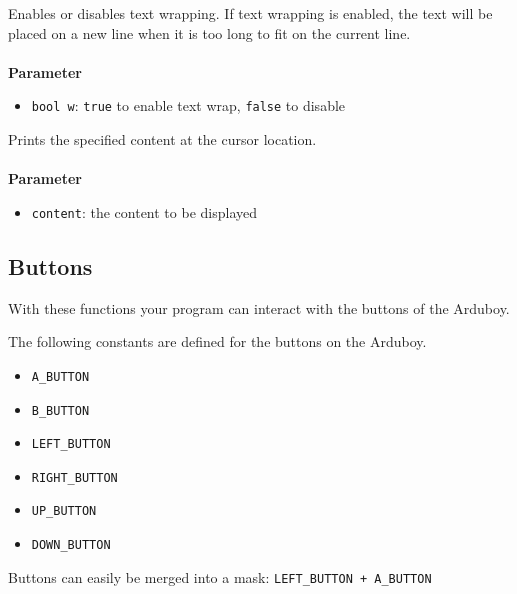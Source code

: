 \documentclass[11pt,fleqn]{book} %
\begin{document}
\begin{libf}[setTextWrap(w)]
	Enables or disables text wrapping. If text wrapping is enabled, the text will be placed on a new line when it is too long to fit on the current line.\\ \\
	\textbf{Parameter}
	\begin{itemize}
		\item \texttt{bool w}: \texttt{true} to enable text wrap, \texttt{false} to disable
	\end{itemize}
\end{libf}

\begin{libf}
	Prints the specified content at the cursor location.\\ \\
	\textbf{Parameter}
	\begin{itemize}
		\item \texttt{content}: the content to be displayed
	\end{itemize}
\end{libf}

\subsection{Buttons}
With these functions your program can interact with the buttons of the Arduboy.

\begin{libf}
	The following constants are defined for the buttons on the Arduboy.
	\begin{multicols}{3}
		\begin{itemize}
			\item \texttt{A\_BUTTON}
			\item \texttt{B\_BUTTON}
			\item \texttt{LEFT\_BUTTON}
			\item \texttt{RIGHT\_BUTTON}
			\item \texttt{UP\_BUTTON}
			\item \texttt{DOWN\_BUTTON}
		\end{itemize}
	\end{multicols}

	Buttons can easily be merged into a mask: \texttt{LEFT\_BUTTON + A\_BUTTON}
\end{libf}
\end{document}
